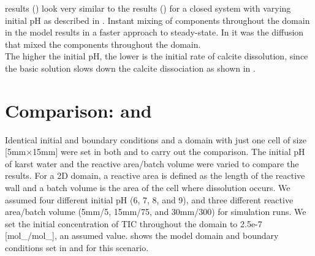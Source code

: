 \MATLAB results () look very similar to the \DuMuX results () 
for a closed system with varying initial pH as described in . Instant mixing of components throughout the domain 
in the \MATLAB model results in a faster approach to steady-state. In \DuMuX it was the diffusion that mixed the components throughout the domain. \\

The higher the initial pH, the lower is the initial rate of calcite dissolution, since the basic solution slows down the calcite dissociation 
as shown in .

\section{Comparison: \DuMuX and \MATLAB} \label{sec:dvm}
Identical initial and boundary conditions and a domain with just one cell of size [5mm$\times$15mm] were set in both \MATLAB and \DuMuX 
to carry out the comparison. The initial pH of karst water and the reactive area/batch volume were varied to compare the results. 
For a 2D domain, a reactive area is defined as the length of the reactive wall and a batch volume is the area of the cell where dissolution occurs. 
We assumed four different initial pH (6, 7, 8, and 9), and three different reactive area/batch 
volume (5mm/5, 15mm/75, and 30mm/300) for simulation runs. We set the initial concentration of TIC 
throughout the domain to 2.5e-7 [mol\_/mol\_], 
an assumed value.  shows the model domain and boundary conditions set in \MATLAB and \DuMuX for this scenario. \\

